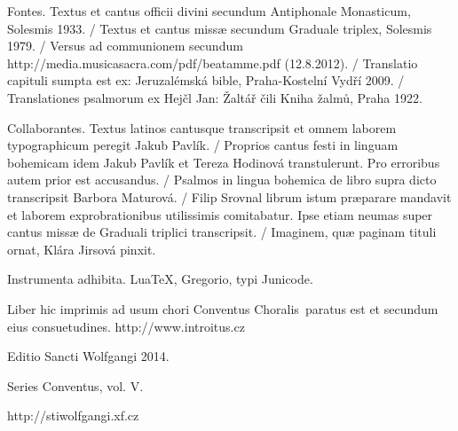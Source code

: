 \documentclass[a4paper, twoside, 12pt]{article}
\newcommand{\annusEditionis}{2014}
\begin{document}
\newpage
\RemoveSideThumbs
\pagestyle{empty}

\mbox{} %
\newpage %


\vspace*{5cm}

Fontes.
Textus et cantus officii divini secundum
Antiphonale Monasticum, Solesmis 1933. /
Textus et cantus missæ secundum
Graduale triplex, Solesmis 1979. /
Versus ad communionem secundum
http://media.musicasacra.com/pdf/beatamme.pdf (12.8.2012). /
Translatio capituli sumpta est ex:
Jeruzalémská bible, Praha-Kostelní Vydří 2009. /
Translationes psalmorum ex
Hejčl Jan: Žaltář čili Kniha žalmů, Praha 1922.

Collaborantes.
Textus latinos cantusque transcripsit et omnem laborem typographicum peregit
Jakub Pavlík. /
Proprios cantus festi in linguam bohemicam idem Jakub Pavlík et Tereza Hodinová
transtulerunt. Pro erroribus autem prior est accusandus. /
Psalmos in lingua bohemica de libro supra dicto transcripsit
Barbora Maturová. /
Filip Srovnal librum istum præparare mandavit et laborem exprobrationibus
utilissimis comitabatur. Ipse etiam neumas super cantus missæ
de Graduali triplici transcripsit. /
Imaginem, quæ paginam tituli ornat, Klára Jirsová pinxit.

Instrumenta adhibita.
LuaTeX, %
Gregorio, %
typi Junicode. %

\begin{center}
Liber hic imprimis ad usum chori
\guillemotright Conventus Choralis\guillemotleft\
paratus est
et secundum eius consuetudines.
http://www.introitus.cz

\vspace{1cm}

{\large Editio Sancti Wolfgangi \annusEditionis.}

\vspace{2mm}

Series \guillemotright Conventus\guillemotleft, vol. V.

\vspace{1cm}

http://stiwolfgangi.xf.cz

\end{center}

\vfill
\end{document}
